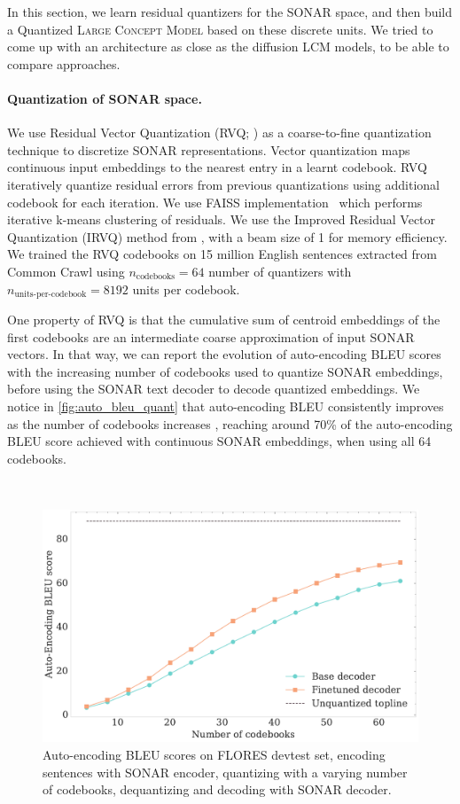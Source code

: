 \documentclass[twoside,11pt]{fairmeta}
\newcommand{\lcm}{\textsc{LCM}\xspace}
\newcommand{\LCM}{\textsc{Large Concept Model}\xspace}
\begin{document}
In this section, we learn residual quantizers for the SONAR space, and then build a Quantized \LCM based on these discrete units. We tried to come up with an architecture as close as the diffusion \lcm models, to be able to compare approaches.

\paragraph{Quantization of SONAR space.} We use Residual Vector Quantization (RVQ; \citet{zeghidour2021soundstream}) as a coarse-to-fine quantization technique to discretize SONAR representations. Vector quantization maps continuous input embeddings to the nearest entry in a learnt codebook. RVQ iteratively quantize residual errors from previous quantizations using additional codebook for each iteration. We use FAISS implementation~\citep{douze2024faiss}
which performs iterative k-means clustering of residuals. We use the Improved Residual Vector Quantization (IRVQ) method from \citet{liu2015improved}, with a beam size of 1 for memory efficiency. We trained the RVQ codebooks on 15 million English sentences extracted from Common Crawl using $n_\text{codebooks} = 64$ number of quantizers with $n_\text{units-per-codebook}=8192$ units per codebook. 

One property of RVQ is that the cumulative sum of centroid embeddings of the first codebooks are an intermediate coarse approximation of input SONAR vectors. In that way, we can report the evolution of auto-encoding BLEU scores with the increasing number of codebooks used to quantize SONAR embeddings, before using the SONAR text decoder to decode quantized embeddings. We notice in \autoref{fig:auto_bleu_quant} that auto-encoding BLEU consistently improves as the number of codebooks increases , reaching around 70\% of the auto-encoding BLEU score achieved with continuous SONAR embeddings, when using all 64 codebooks. %

\
\begin{figure}[!ht]
    \centering
    \includegraphics[width=0.4\linewidth]{figures/quant_auto_encoding_bleu.pdf}
    \caption{Auto-encoding BLEU scores on FLORES devtest set, encoding sentences with SONAR encoder, quantizing with a varying number of codebooks, dequantizing and decoding with SONAR decoder.}
    \label{fig:auto_bleu_quant}
\end{figure}
\end{document}
